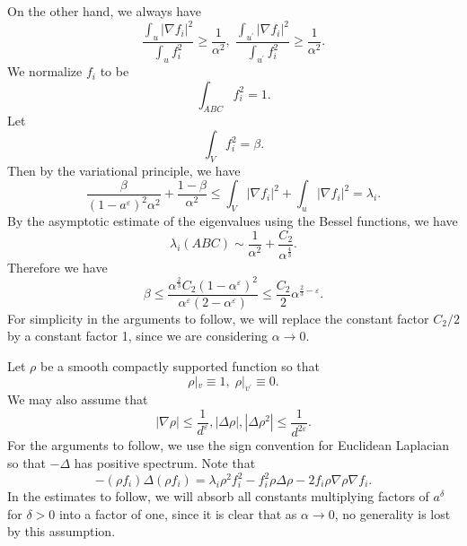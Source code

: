 On the other hand, we always have 
%
\[\frac{\int_u | \nabla f _i|^2}{\int_u f_i^2 } \geq \frac{1}{\alpha^2} , \; \frac{\int_{u^{\prime}} | \nabla f _i|^2}{\int_{u^{\prime}} f_i^2 }\geq \frac{1}{\alpha^2} .\]
We normalize $ f_i$ to be 
%
\[\int_{ABC} f _i ^2 = 1 .\]
%
Let 
%
\[\int _V f_i^2 = \beta .\]
%
Then by  the variational principle, we have 
%
\[ \frac{\beta}{(1- a ^{\varepsilon} )^2 \alpha ^2} + \frac{1-\beta}{\alpha ^2} \leq \int_V | \nabla f_i |^2 + \int_u |\nabla f _i |^2 = \lambda _i .\]
%
By the asymptotic estimate of the eigenvalues using  the Bessel functions, we have 
%
\[ \lambda _i (ABC) \sim \frac{1}{\alpha^2} + \frac{C_2 }{\alpha ^\frac{4}{3}}.\]
%
Therefore we have 
%
\[ \beta \leq \frac{\alpha ^{\frac{2}{3}} C_2 ( 1 - \alpha ^\varepsilon )^2}{\alpha ^\varepsilon ( 2 - \alpha ^\varepsilon)} \leq \frac{C_2}{2} \alpha ^{\frac{2}{3} - \varepsilon}.\]
%
For simplicity in the arguments to follow, we will replace the constant factor $ C_2 / 2 $ by a constant factor 1, since we are considering $ \alpha \rightarrow 0 $.

Let $\rho $ be a smooth compactly supported function so that 
%
\[ \rho |_v \equiv 1, \; \rho |_{v^{\prime }}  \equiv 0 .\]
%
We may also assume that 
%
\[ | \nabla \rho | \leq \frac{1}{d ^\varepsilon} , |\Delta \rho |, | \Delta \rho^2 |\leq \frac{1}{d ^{ 2 \varepsilon }}.\]
%
For the arguments to follow, we use the sign convention for Euclidean Laplacian so that $ - \Delta $ has positive spectrum. Note that 
%
\[ - ( \rho f_i) \Delta ( \rho f_i) = \lambda _i \rho ^2 f _i ^2 - f _i ^2 \rho \Delta \rho - 2 f _i \rho \nabla \rho \nabla f _i.\]
%
In the estimates to follow, we will absorb all constants multiplying factors of $ a ^\delta $ for $ \delta > 0 $ into a factor of one, since it is clear that as $ \alpha \rightarrow 0$, no generality is lost by this assumption.

